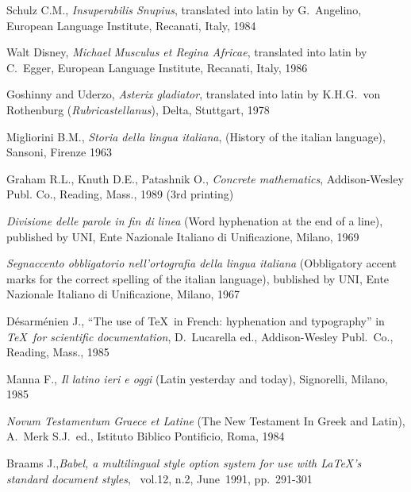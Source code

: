 \documentclass{ltugboat}
\begin{document}
\normalsize
\begin{thebibliography}{99}

  Schulz  C.M., {\it Insuperabilis Snupius}, translated into
latin by G.~Angelino, European Language Institute, Recanati, Italy, 1984

  Walt  Disney,  {\it  Michael  Musculus et Regina Africae},
translated into latin by C.~Egger, European  Language  Institute,  Recanati,
Italy, 1986

  Goshinny  and Uderzo, {\it Asterix gladiator}, translated
into latin  by  K.H.G.~von  Rothenburg  ({\it  Rubricastellanus\/}),  Delta,
Stuttgart, 1978

  Migliorini  B.M.,  {\it Storia della lingua italiana},
(History of the italian language), Sansoni, Firenze 1963

  Graham  R.L.,  Knuth  D.E.,  Patashnik  O.,  {\it  Concrete
mathematics}, Addison-Wesley Publ. Co., Reading, Mass., 1989 (3rd printing)

    {\it  Divisione  delle  parole  in  fin  di  linea}  (Word
hyphenation at the end of a line), published by UNI, Ente Nazionale Italiano
di Unificazione, Milano, 1969

  {\it  Segnaccento  obbligatorio nell'ortografia della lingua
italiana} (Obbligatory accent marks for the correct spelling of the  italian
language),  bublished  by  UNI,  Ente  Nazionale  Italiano  di Unificazione,
Milano, 1967

  D\'esarm\'enien  J.,  ``The  use  of \TeX\ in French:
hyphenation and typography'' in {\it \TeX\  for  scientific  documentation},
D.~Lucarella ed., Addison-Wesley Publ.\ Co., Reading, Mass., 1985

  Manna  F., {\it Il latino ieri e oggi} (Latin yesterday and
today), Signorelli, Milano, 1985

  {\it  Novum Testamentum Graece et Latine} (The New Testament
In Greek and Latin),  A.~Merk S.J.\ ed., Istituto Biblico Pontificio,  Roma,
1984

  Braams  J.,{\it  Babel, a multilingual style option system
for  use  with  \LaTeX's  standard  document  styles},  \TUB\  vol.12,  n.2,
June~1991, pp.~291-301

\end{thebibliography}

\makesignature
\end{document}
